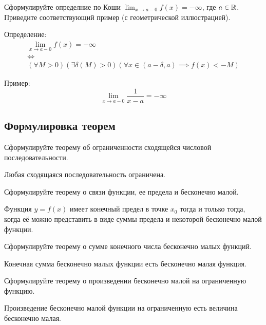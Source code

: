 \begin{question}
  Сформулируйте определние по Коши $\lim_{x \to a-0} f(x) = -\infty$, где $a \in \mathbb{R}$.
Приведите соответствующий пример (с геометрической иллюстрацией).
\end{question}
\begin{answer}
  Определение:
  \begin{gather*}
    \lim_{x \to a - 0} f(x) = -\infty \\
    \iff \\
    (\forall M > 0)(\exists \delta(M) > 0)(\forall x \in (a - \delta, a) \implies f(x) < -M)
  \end{gather*}

  Пример: \[
    \lim_{x \to a - 0} \frac{1}{x - a} = -\infty
  \] 
\end{answer}


\subsection{Формулировка теорем}

\begin{question}
  Сформулируйте теорему об ограниченности сходящейся числовой последовательности.
\end{question}
\begin{answer}
  Любая сходящаяся последовательность ограничена.
\end{answer}

\begin{question}
  Сформулируйте теорему о связи функции, ее предела и бесконечно малой.  
\end{question}
\begin{answer}
  Функция $y = f(x)$ имеет конечный предел в точке  $x_0$ тогда и только тогда, когда её можно представить в виде суммы предела и некоторой бесконечно малой функции.
\end{answer}

\begin{question}
  Сформулируйте теорему о сумме конечного числа бесконечно малых функций.
\end{question}
\begin{answer}
  Конечная сумма бесконечно малых функции есть бесконечно малая функция.
\end{answer}

\begin{question}
  Сформулируйте теорему о произведении бесконечно малой на ограниченную функцию.
\end{question}
\begin{answer}
  Произведение бесконечно малой функции на ограниченную есть величина бесконечно малая.  
\end{answer}

